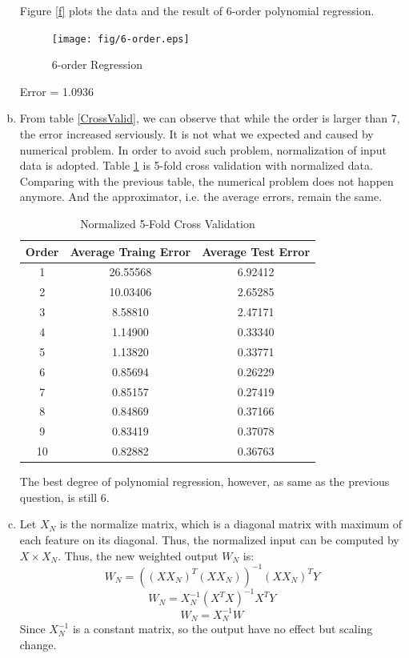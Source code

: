 \documentclass[a4paper, 12pt, titlepage]{article}
\begin{document}
\begin{enumerate}[(a)]
            Figure \ref{f} plots the data and the result of 6-order polynomial regression.

            \begin{figure}[H]
                \centering
                \texttt{[image: fig/6-order.eps]}
                \caption{6-order Regression}\label{g}
            \end{figure}

            Error = 1.0936

        \item From table \ref{CrossValid}, we can observe that while the order is larger than 7, the error increased serviously. It is not what we expected and caused by numerical problem. In order to avoid such problem, normalization of input data is adopted. Table \ref{NCrossValid} is 5-fold cross validation with normalized data. Comparing with the previous table, the numerical problem does not happen anymore. And the approximator, i.e. the average errors, remain the same.
            \begin{table}[H]
                \centering
                \begin{tabular}{ccc}
                Order & Average Traing Error & Average Test Error \\
                    \hline
                1 & 26.55568 & 6.92412 \\
                2 & 10.03406 & 2.65285 \\
                3 & 8.58810  & 2.47171 \\
                4 & 1.14900  & 0.33340 \\
                5 & 1.13820  & 0.33771 \\
                6 & 0.85694  & 0.26229 \\
                7 & 0.85157  & 0.27419 \\
                8 & 0.84869  & 0.37166 \\
                9 & 0.83419  & 0.37078 \\
                10 & 0.82882  & 0.36763 \\
                \end{tabular}
                \caption{Normalized 5-Fold Cross Validation}
                \label{NCrossValid}
            \end{table}

            The best degree of polynomial regression, however, as same as the previous question, is still 6.

        \item Let $X_N$ is the normalize matrix, which is a diagonal matrix with maximum of each feature on its diagonal. Thus, the normalized input can be computed by $X\times{}X_N$.
            Thus, the new weighted output $W_N$ is:
            $$W_N = ((XX_N)^T(XX_N))^{-1}(XX_N)^TY$$
            $$W_N = X_N^{-1}(X^TX)^{-1}X^TY$$
            $$W_N = X_N^{-1}W$$
            Since $X_N^{-1}$ is a constant matrix, so the output have no effect but scaling change.
            


\end{enumerate}
\end{document}
